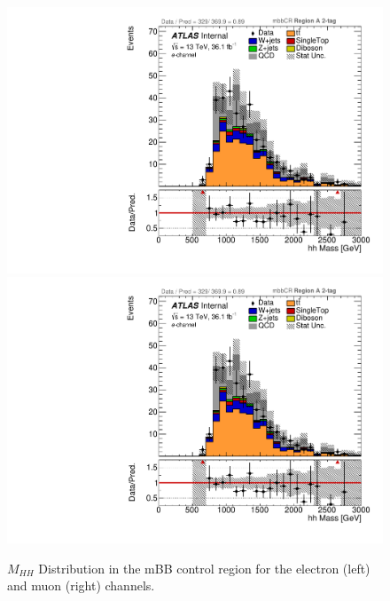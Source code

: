 \begin{figure}[h]
\begin{center}
\includegraphics[scale=0.33]{figures/abcd_plots/elec_mbbcr_RegionA_hhMass_withDD}
\includegraphics[scale=0.33]{figures/abcd_plots/elec_mbbcr_RegionA_hhMass_withDD}
\caption{${M_{HH}}$ Distribution in the mBB control region for the electron (left) and muon (right) channels.}
\label{fig:mbbcr_plots}
\end{center}
\end{figure}

